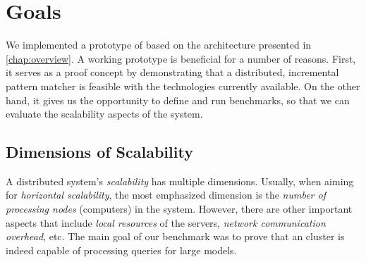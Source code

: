 \section{Goals}

We implemented a prototype of \iqd{} based on the architecture presented in \autoref{chap:overview}. A working prototype is beneficial for a number of reasons. First, it serves as a proof concept by demonstrating that a distributed, incremental pattern matcher is feasible with the technologies currently available.
On the other hand, it gives us the opportunity to define and run benchmarks, so that we can evaluate the scalability aspects of the system.

\subsection{Dimensions of Scalability}

A distributed system's \emph{scalability} has multiple dimensions. Usually, when aiming for \emph{horizontal scalability}, the most emphasized dimension is the \emph{number of processing nodes} (computers) in the system. However, there are other important aspects that include \emph{local resources} of the servers, \emph{network communication overhead}, etc. The main goal of our benchmark was to prove that an \iqd{} cluster is indeed capable of processing queries for large models.
